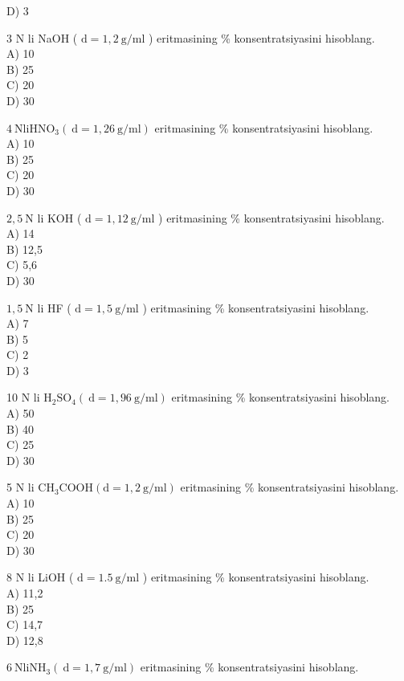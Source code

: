 D) 3
  \item 3 N li NaOH ( $\mathrm{d}=1,2 \mathrm{~g} / \mathrm{ml}$ ) eritmasining \% konsentratsiyasini hisoblang.\\
A) 10\\
B) 25\\
C) 20\\
D) 30\\
  \item $4 \mathrm{~N} \mathrm{li} \mathrm{HNO}_{3}(\mathrm{~d}=1,26 \mathrm{~g} / \mathrm{ml})$ eritmasining \% konsentratsiyasini hisoblang.\\
A) 10\\
B) 25\\
C) 20\\
D) 30
  \item $2,5 \mathrm{~N}$ li KOH ( $\mathrm{d}=1,12 \mathrm{~g} / \mathrm{ml}$ ) eritmasining \% konsentratsiyasini hisoblang.\\
A) 14\\
B) 12,5\\
C) 5,6\\
D) 30
  \item $1,5 \mathrm{~N}$ li HF ( $\mathrm{d}=1,5 \mathrm{~g} / \mathrm{ml}$ ) eritmasining \% konsentratsiyasini hisoblang.\\
A) 7\\
B) 5\\
C) 2\\
D) 3
  \item 10 N li $\mathrm{H}_{2} \mathrm{SO}_{4}(\mathrm{~d}=1,96 \mathrm{~g} / \mathrm{ml})$ eritmasining \% konsentratsiyasini hisoblang.\\
A) 50\\
B) 40\\
C) 25\\
D) 30
  \item 5 N li $\mathrm{CH}_{3} \mathrm{COOH}(\mathrm{d}=1,2 \mathrm{~g} / \mathrm{ml})$ eritmasining \% konsentratsiyasini hisoblang.\\
A) 10\\
B) 25\\
C) 20\\
D) 30
  \item 8 N li LiOH ( $\mathrm{d}=1.5 \mathrm{~g} / \mathrm{ml}$ ) eritmasining \% konsentratsiyasini hisoblang.\\
A) 11,2\\
B) 25\\
C) 14,7\\
D) 12,8
  \item $6 \mathrm{~N} \mathrm{li} \mathrm{NH}_{3}(\mathrm{~d}=1,7 \mathrm{~g} / \mathrm{ml})$ eritmasining \% konsentratsiyasini hisoblang.\\
